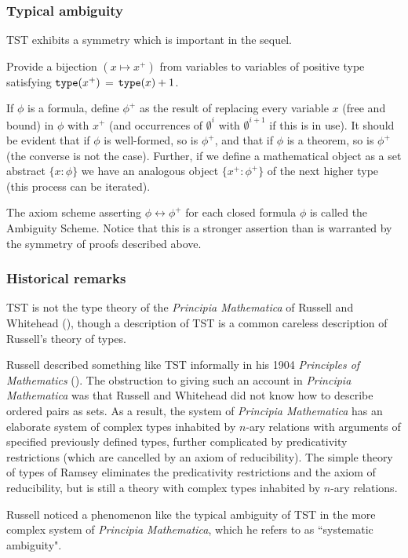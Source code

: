 \documentclass[112pt]{article}
\begin{document}
\subsubsection{Typical ambiguity}

TST exhibits a symmetry which is important in the sequel.

Provide a bijection $(x \mapsto x^+)$ from variables to variables of positive type satisfying   ${\tt type}(x^+)$ = ${\tt type}(x)+1$.

If $\phi$ is a formula, define $\phi^+$ as the result of replacing every variable $x$ (free and bound) in $\phi$ with $x^+$ (and occurrences of $\emptyset^i$ with $\emptyset^{i+1}$ if this is in use).   It should be evident that if $\phi$ is well-formed, so is $\phi^+$,
and that if $\phi$ is a theorem, so is $\phi^+$ (the converse is not the case).  Further, if we define a mathematical object as a set abstract $\{x:\phi\}$ we have an analogous
object $\{x^+:\phi^+\}$ of the next higher type (this process can be iterated).

The axiom scheme asserting $\phi \leftrightarrow \phi^+$ for each closed formula $\phi$ is called the Ambiguity Scheme.   Notice that this is a stronger assertion than is warranted by the symmetry of proofs described above.

\subsubsection{Historical remarks}

TST is not the type theory of the {\em Principia Mathematica\/} of Russell and Whitehead (\cite{pm}), though a description of TST is a common careless description of Russell's theory of types.

Russell described something like TST informally in his 1904 {\em Principles of Mathematics\/} (\cite{pm1}).  The obstruction to giving such an account in {\em Principia Mathematica\/} was that
Russell and Whitehead did not know how to describe ordered pairs as sets.  As a result, the system of {\em Principia Mathematica\/} has an elaborate system of  complex
types inhabited by $n$-ary relations with arguments of specified previously defined types, further complicated by predicativity restrictions (which are cancelled by an axiom of reducibility).
The simple theory of types of Ramsey eliminates the predicativity restrictions and the axiom of reducibility, but is still a theory with complex types inhabited by $n$-ary relations.

Russell noticed a phenomenon like the typical ambiguity of TST in the more complex system of {\em Principia Mathematica\/}, which he refers to as ``systematic ambiguity".
\end{document}
